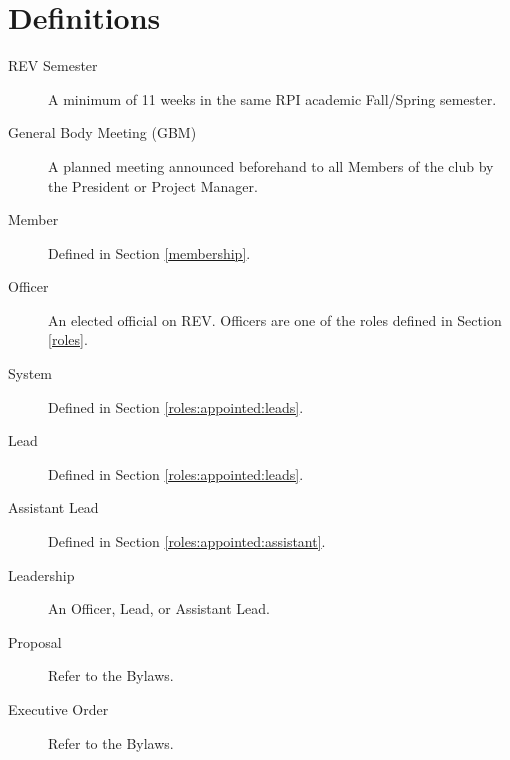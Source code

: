 \section{Definitions}
\label{definitions}
\begin{description}
\item[REV Semester] A minimum of 11 weeks in the same RPI academic Fall/Spring semester.
\item[General Body Meeting (GBM)] A planned meeting announced beforehand to all Members of the club by the President or Project Manager.
\item[Member] Defined in Section \ref{membership}.
\item[Officer] An elected official on REV. Officers are one of the roles defined in Section \ref{roles}.
\item[System] Defined in Section \ref{roles:appointed:leads}.
\item[Lead] Defined in Section \ref{roles:appointed:leads}.
\item[Assistant Lead] Defined in Section \ref{roles:appointed:assistant}.
\item[Leadership] An Officer, Lead, or Assistant Lead.
\item[Proposal] Refer to the Bylaws.
\item[Executive Order] Refer to the Bylaws.
\end{description}